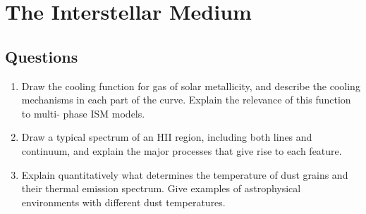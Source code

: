 \section{The Interstellar Medium}
\subsection{Questions}
\begin{enumerate}
\item Draw the cooling function for gas of solar metallicity, and describe the cooling
      mechanisms in each part of the curve. Explain the relevance of this function to multi-
      phase ISM models.
\item Draw a typical spectrum of an HII region, including both lines and continuum, and
      explain the major processes that give rise to each feature.
\item Explain quantitatively what determines the temperature of dust grains and their
      thermal emission spectrum. Give examples of astrophysical environments with different
      dust temperatures.
\end{enumerate}
